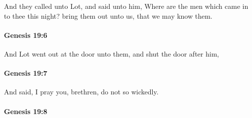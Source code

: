 			And they called unto Lot, and said unto him, Where are the men which came in to thee this night?  bring them out unto us, that we may know them.


		\paragraph{Genesis 19:6} %
			\label{GENESIS-19-6}

			And Lot went out at the door unto them, and shut the door after him,


		\paragraph{Genesis 19:7} %
			\label{GENESIS-19-7}

			And said, I pray you, brethren, do not so wickedly.


		\paragraph{Genesis 19:8} %
			\label{GENESIS-19-8}

